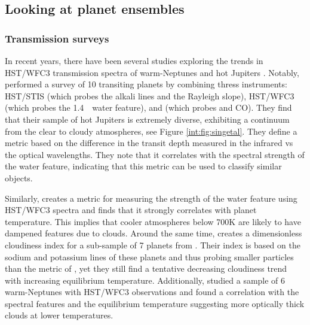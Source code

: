 

\subsection{Looking at planet ensembles}


\subsubsection{Transmission surveys}


In recent years, there have been several studies exploring the trends in HST/WFC3 transmission spectra of warm-Neptunes \citep{Crossfield2017} and hot Jupiters \citep{Stevenson2016a, Sing2016, Heng2016, Barstow2017, Fu2017, Tsiaras2018}. Notably, \citet{Sing2016} performed a survey of 10 transiting planets by combining thress instruments: HST/STIS (which probes the alkali lines and the Rayleigh slope), HST/WFC3 (which probes the 1.4~\um~water feature), and \spitzerIRAC (which probes  and CO). They find that their sample of hot Jupiters is extremely diverse, exhibiting a continuum from the clear to cloudy atmospheres, see Figure \ref{int:fig:singetal}. They define a metric based on the difference in the transit depth measured in the infrared vs the optical wavelengths. They note that it correlates with the spectral strength of the water feature, indicating that this metric can be used to classify similar objects.

Similarly, \citet{Stevenson2016b} creates a metric for measuring the strength of the water feature using HST/WFC3 spectra and finds that it strongly correlates with planet temperature. This implies that cooler atmospheres below 700K are likely to have dampened features due to clouds. Around the same time, \citet{Heng2016} creates a dimensionless cloudiness index for a sub-sample of 7 planets from \citet{Sing2016}. Their index is based on the sodium and potassium lines of these planets and thus probing smaller particles than the metric of \citet{Stevenson2016b}, yet they still find a tentative decreasing cloudiness trend with increasing equilibrium temperature. Additionally, \citet{Crossfield2017} studied a sample of 6 warm-Neptunes with HST/WFC3 observations and found a correlation with the spectral features and the equilibrium temperature suggesting more optically thick clouds at lower temperatures.


